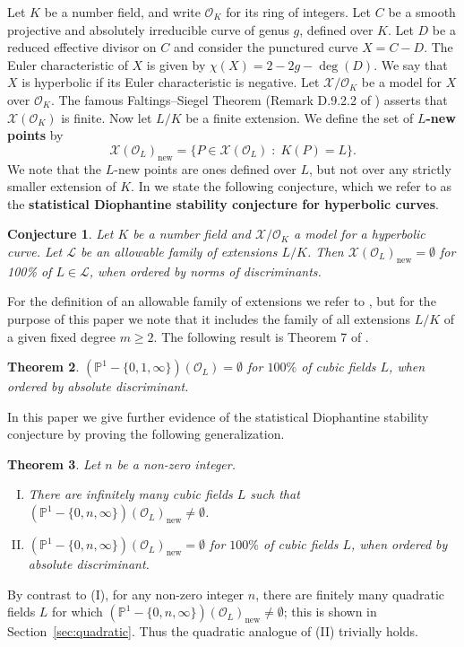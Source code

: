 \documentclass{amsart}
\newcommand{\PP}{\mathbb{P}}
\newcommand{\cX}{\mathscr{X}}
\newcommand{\cL}{\mathcal{L}}
\newcommand{\OO}{\mathcal{O}}
\renewcommand{\setminus}{-}
\newtheorem{thm}{Theorem}
\newtheorem{conj}[thm]{Conjecture}
\theoremstyle{definition}
\theoremstyle{remark}
\begin{document}
Let $K$ be a number field, and write $\OO_K$ for its ring of integers.
Let $C$ be a smooth projective and absolutely irreducible curve of genus $g$, defined over
$K$.
Let $D$ be a reduced effective divisor
on $C$ and consider the punctured curve $X=C \setminus D$. The
Euler characteristic of $X$ is given by $\chi(X)=2-2g-\deg(D)$. We say
that $X$ is hyperbolic if its Euler characteristic is negative. 
Let $\cX/\OO_K$ be
a model for $X$ over $\OO_K$.
The famous Faltings--Siegel Theorem (Remark D.9.2.2 of \cite{MR1745599})
asserts that $\cX(\OO_K)$ is finite. 
Now let $L/K$ be a finite extension.
We define the set of \textbf{$L$-new points} by
\[
\cX(\OO_L)_\mathrm{new}=\{ P \in \cX(\OO_L) \; : \; K(P)=L\}.
\]
We note that the $L$-new points are ones defined over $L$,
but not over any strictly smaller extension of $K$.
In \cite{KS_stab} we state the following conjecture, which we refer to as the
\textbf{statistical Diophantine stability conjecture for hyperbolic curves}.
\begin{conj}\label{conj:diostab}
Let $K$ be a number field and $\cX/\OO_K$ a model
for a hyperbolic curve. Let $\cL$ be an allowable family of extensions $L/K$.
Then $\cX(\OO_L)_{\mathrm{new}}=\emptyset$ for 100\% of
$L \in \cL$, when ordered by norms of discriminants.
\end{conj}
For the definition of an allowable family of extensions we refer to \cite{KS_stab},
but for the purpose of this paper we note that it includes the family
of all extensions $L/K$ of a given fixed degree $m \ge 2$. The following result 
is Theorem 7 of \cite{KS_stab}.
\begin{thm}\label{thm:original}
	$(\PP^1 \setminus \{0,1,\infty\})(\OO_L)=\emptyset$ for $100\%$
	of cubic fields $L$, when ordered by absolute discriminant.
\end{thm}

In this paper we give further evidence of the statistical Diophantine
stability conjecture by proving the following generalization.

\begin{thm}\label{thm:main}
Let $n$ be a non-zero integer. 
	\begin{enumerate}[(I)]
		\item There are infinitely many cubic fields $L$ such that
			$(\PP^1 \setminus \{0,n,\infty\})(\OO_L)_{\mathrm{new}} \ne \emptyset$.
		\item $(\PP^1 \setminus \{0,n,\infty\})(\OO_L)_{\mathrm{new}}=\emptyset$ for $100\%$
		of cubic fields $L$, when ordered by absolute discriminant.
	\end{enumerate}
\end{thm}
By contrast to (I), for any non-zero integer $n$, there are finitely many quadratic
fields $L$ for which $(\PP^1 \setminus \{0,n,\infty\})(\OO_L)_{\mathrm{new}} \ne \emptyset$;
this is shown in Section~\ref{sec:quadratic}. Thus the quadratic analogue of (II)
trivially holds.
\end{document}
